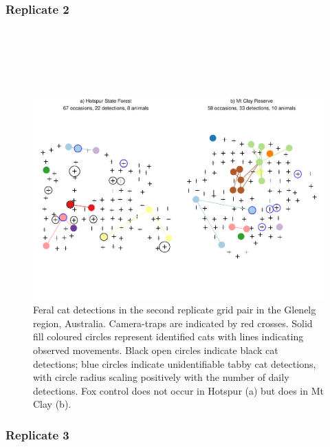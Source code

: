 \documentclass[11pt,a4paper,titlepage,twoside,openright]{style/unimelbthesis}
\begin{document}
\begin{mainmatter}
\hypertarget{replicate-2}{%
\subsubsection{Replicate 2}\label{replicate-2}}

\(~\)

\(~\)

\(~\)
\begin{figure}

{\centering \includegraphics[width=1\linewidth]{figure/density-plot-ch-2-1} 

}

\caption{Feral cat detections in the second replicate grid pair in the Glenelg region, Australia. Camera-traps are indicated by red crosses. Solid fill coloured circles represent identified cats with lines indicating observed movements. Black open circles indicate black cat detections; blue circles indicate unidentifiable tabby cat detections, with circle radius scaling positively with the number of daily detections. Fox control does not occur in Hotspur (a) but does in Mt Clay (b).}\label{fig:density-plot-ch-2}
\end{figure}
\newpage

\hypertarget{replicate-3}{%
\subsubsection{Replicate 3}\label{replicate-3}}

\(~\)

\(~\)

\(~\)
\begin{figure}


\end{figure}
\end{mainmatter}
\end{document}
